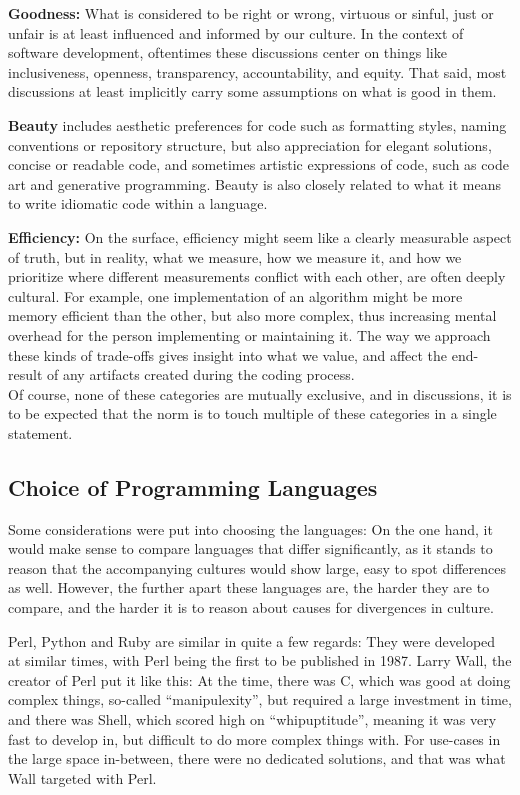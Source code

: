 \textbf{Goodness:} What is considered to be right or wrong, virtuous or sinful, just or unfair is at least influenced and informed
by our culture. In the context of software development, oftentimes these discussions center on things like inclusiveness,
openness, transparency, accountability, and equity. That said, most discussions at least implicitly carry some
assumptions on what is good in them.

\textbf{Beauty} includes aesthetic preferences for code such as formatting styles, naming conventions or repository
structure, but also appreciation for elegant solutions, concise or readable code, and sometimes artistic expressions of
code, such as code art and generative programming. Beauty is also closely related to what it means to write idiomatic
code within a language.

\textbf{Efficiency:} On the surface, efficiency might seem like a clearly measurable aspect of truth, but in reality, what we
measure, how we measure it, and how we prioritize where different measurements conflict with each other, are often deeply cultural.
For example, one implementation of an algorithm might be more memory efficient than the other, but also more complex,
thus increasing mental overhead for the person implementing or maintaining it. The way
we approach these kinds of trade-offs gives insight into what we value, and affect the end-result of any artifacts
created during the coding process.
\\
Of course, none of these categories are mutually exclusive, and in discussions, it is to be expected that the norm is
to touch multiple of these categories in a single statement.

\subsection{Choice of Programming Languages}
\label{sec:2.3}
Some considerations were put into choosing the languages: On the one hand, it would make sense to compare languages that
differ significantly, as it stands to reason that the accompanying cultures would show large, easy to spot differences as well.
However, the further apart these languages are, the harder they are to compare, and the harder it is to reason about
causes for divergences in culture.

Perl, Python and Ruby are similar in quite a few regards: They were developed at similar times, with Perl being the first
to be published in 1987. Larry Wall, the creator of Perl put it like this: At the time, there was C, which was good at
doing complex things, so-called “manipulexity”, but required a large investment in time, and there was Shell, which
scored high on “whipuptitude”, meaning it was very fast to develop in, but difficult to do more complex things with. For
use-cases in the large space in-between, there were no dedicated solutions, and that was what Wall targeted with Perl. \cite[ par. 15-19]{larry_talk}

